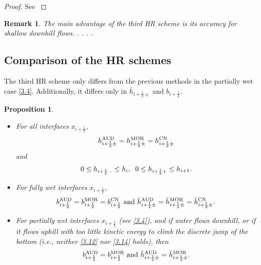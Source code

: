 \documentclass[11pt,a4paper,center,notitlepage]{article}
\numberwithin{equation}{section}
\newtheorem{prop}{Proposition}
\newtheorem{remark}{Remark}
\begin{document}
\begin{proof}
See \cite[pp. 768--769]{Chen2017}
\end{proof}

\begin{remark}
The main advantage of the third HR scheme is its accuracy for shallow downhill flows. . . . . 
\end{remark}

\subsection{Comparison of the HR schemes}
The third HR scheme only differs from the previous methods in the partially wet case \eqref{3.4}. Additionally, it differs only in $\bar h _{i+\frac{1}{2}\pm}$ and $b_{i+\frac{1}{2}}$.

\begin{prop}
\begin{itemize}
\item[i)] For all interfaces $x_{i+\frac{1}{2}}$,
\begin{align}
h_{i + \frac{1}{2} \pm }^{\rm AUD} = h_{i + \frac{1}{2} \pm }^{\rm MOR} = h_{i + \frac{1}{2} \pm }^{\rm CN}
\end{align}
and 
\begin{align}
0 \le {h_{i + \frac{1}{2} - }} \le {h_i},\hspace{2mm} 0 \le {h_{i + \frac{1}{2} + }} \le {h_{i + 1}}.
\end{align}
\item[ii)] For fully wet interfaces $x_{i+\frac{1}{2}}$,
\begin{align}
b_{i + \frac{1}{2}}^{\rm AUD} = b_{i + \frac{1}{2}}^{\rm MOR} = b_{i + \frac{1}{2}}^{\rm CN} \mbox{ and } \bar h_{i + \frac{1}{2} \pm }^{\rm AUD} = \bar h_{i + \frac{1}{2} \pm }^{\rm MOR} = \bar h_{i + \frac{1}{2} \pm }^{\rm CN}.
\end{align}
\item[iii)] For partially wet interfaces $x_{i+\frac{1}{2}}$ (see \eqref{3.4}), and if water flows downhill, or if it flows uphill with too little kinetic energy to climb the discrete jump of the bottom (i.e., neither \eqref{3.12} nor \eqref{3.14} holds), then
\begin{align}
b_{i + \frac{1}{2}}^{\rm AUD} = b_{i + \frac{1}{2}}^{\rm MOR} \mbox{ and } \bar h_{i + \frac{1}{2} \pm }^{\rm AUD} = \bar h_{i + \frac{1}{2} \pm }^{\rm MOR}.
\end{align}
\end{itemize}
\end{prop}
\end{document}
